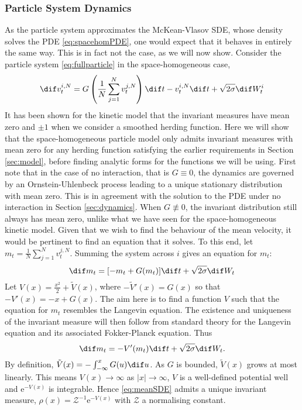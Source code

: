     \subsubsection{Particle System Dynamics}\label{sec:particledynamics}
        As the particle system approximates the McKean-Vlasov SDE, whose density solves the PDE \eqref{eq:spacehomPDE}, one would expect that it behaves in entirely the same way. This is in fact not the case, as we will now show. Consider the particle system \eqref{eq:fullparticle} in the space-homogeneous case,
        \begin{equation}\label{eq:homparticle}
            \dif v^{i,N}_t = G\left(\frac{1}{N}\sum_{j=1}^N v^{j,N}_t\right)\dif t-v^{i,N}_t \dif t + \sqrt{2\sigma} \dif W^i_t
        \end{equation}
        It has been shown for the kinetic model that the invariant measures have mean zero and $\pm 1$ when we consider a smoothed herding function. Here we will show that the space-homogeneous particle model only admits invariant measures with mean zero for any herding function satisfying the earlier requirements in Section \ref{sec:model}, before finding analytic forms for the functions we will be using. First note that in the case of no interaction, that is $G\equiv 0$, the dynamics are governed by an Ornstein-Uhlenbeck process leading to a unique stationary distribution with mean zero. This is in agreement with the solution to the PDE under no interaction in Section \ref{sec:dynamics}. When $G\not\equiv 0$, the invariant distribution still always has mean zero, unlike what we have seen for the space-homogeneous kinetic model. Given that we wish to find the behaviour of the mean velocity, it would be pertinent to find an equation that it solves. To this end, let $m_t = \frac{1}{N}\sum_{j=1}^N v^{j,N}_t$. Summing the system across $i$ gives an equation for $m_t$:
        \[
            \dif m_t = \lbrack -m_t + G(m_t)\rbrack \dif t +\sqrt{2\sigma}\dif W_t
        \]
        Let $V(x) = \frac{x^2}{2} + \tilde{V}(x)$, where $-\tilde{V}'(x) = G(x)$ so that $-V'(x) = -x + G(x)$. The aim here is to find a function $V$ such that the equation for $m_t$ resembles the Langevin equation. The existence and uniqueness of the invariant measure will then follow from standard theory for the Langevin equation and its associated Fokker-Planck equation. Thus
        \begin{equation}\label{eq:meanSDE}
            \dif m_t = -V'(m_t)\dif t + \sqrt{2\sigma}\dif W_t.
        \end{equation}    
        By definition, $\tilde{V}(x) = - \int_{-\infty}^x G(u) \dif u$. As $G$ is bounded, $\tilde{V}(x)$ grows at most linearly. This means $V(x) \to \infty$ as $|x|\to \infty$, $V$ is a well-defined potential well and $\mathrm{e}^{-V(x)}$ is integrable. Hence \eqref{eq:meanSDE} admits a unique invariant measure, $\rho(x) = \mathcal{Z}^{-1}\mathrm{e}^{-V(x)}$ with $\mathcal{Z}$ a normalising constant.
        
